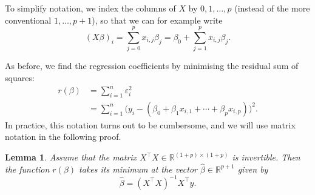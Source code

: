 \documentclass[
  a4paper,
]{article}
\newtheorem{lemma}{Lemma}[section]
\theoremstyle{definition}
\theoremstyle{definition}
\theoremstyle{definition}
\theoremstyle{definition}
\theoremstyle{remark}
\begin{document}
To simplify notation, we index the columns of \(X\) by \(0, 1, \ldots,
p\) (instead of the more conventional \(1, \ldots, p+1\)), so that we
can for example write
\begin{equation*}
  (X \beta)_i
  = \sum_{j=0}^p x_{i,j} \beta_j
  = \beta_0 + \sum_{j=1}^p x_{i,j} \beta_j.
\end{equation*}

As before, we find the regression coefficients by minimising
the residual sum of squares:
\begin{align*}
  r(\beta)
  &= \sum_{i=1}^n \varepsilon_i^2 \\
  &= \sum_{i=1}^n \bigl( y_i - (\beta_0 + \beta_1 x_{i,1} + \cdots + \beta_p x_{i,p}) \bigr)^2.
\end{align*}
In practice, this notation turns out to be cumbersome, and we will
use matrix notation in the following proof.

\begin{lemma}
\protect\hypertarget{lem:multiple-LSQ}{}\label{lem:multiple-LSQ}Assume that the matrix \(X^\top X \in \mathbb{R}^{(1+p) \times (1+p)}\) is
invertible. Then the function \(r(\beta)\) takes its minimum at the
vector \(\hat\beta\in\mathbb{R}^{p+1}\) given by
\begin{equation*}
  \hat\beta
  = (X^\top X)^{-1} X^\top y.
\end{equation*}
\end{lemma}
\end{document}
